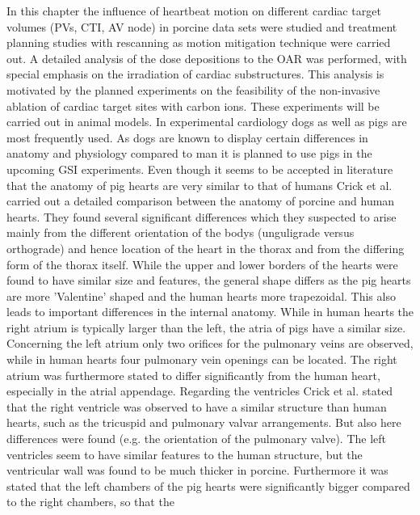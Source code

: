 \documentclass[type=dr, dr=rernat, accentcolor=tud7b,colorbacktitle, bigchapter, openright, twoside, 12pt ]{tudthesis}
\begin{document}
In this chapter the influence of heartbeat motion on different cardiac target volumes (PVs, CTI, AV node) in porcine data sets were studied 
and treatment planning studies with rescanning as motion mitigation technique were carried out. A detailed analysis of the dose depositions to 
the OAR was performed, with special emphasis on the irradiation of cardiac substructures. This analysis is motivated by the planned 
experiments on the feasibility of the non-invasive ablation of cardiac target sites with carbon ions. These experiments will be carried out 
in animal models. In experimental cardiology dogs as well as pigs are most frequently used. As dogs are known to display certain differences 
in anatomy and physiology compared to man \cite{Hug86} \cite{Cri98} it is planned to use pigs in the upcoming GSI experiments.\newline
\newline
Even though it seems to be accepted in literature that the anatomy of pig hearts are very similar to that of humans 
\cite{Lum66} \cite{Dou72} \cite{Hug86} \cite{Coo91} \cite{Whi93} Crick et al. \cite{Cri98} carried out a detailed comparison between the 
anatomy of porcine and human hearts. They found several significant differences which they suspected to arise mainly from the different 
orientation of the bodys (unguligrade versus orthograde) and hence location of the heart in the thorax and from the differing form of 
the thorax itself. While the upper and lower borders of 
the hearts were found to have similar size and features, the general shape differs as the pig hearts are more 'Valentine' shaped and the human 
hearts more trapezoidal. This also leads to important differences  in the internal anatomy. While in human hearts the right atrium is 
typically larger than the left, the atria of pigs have a similar size. Concerning the left atrium only two orifices for the pulmonary veins 
are observed, while in human hearts four pulmonary vein openings can be located. The right atrium was furthermore stated to differ 
significantly from the human heart, especially in the atrial appendage. 
Regarding the ventricles Crick et al. stated that the right ventricle was observed to have a similar structure than human hearts, such as 
the tricuspid and pulmonary valvar arrangements. But also here differences were found (e.g. the orientation of the pulmonary valve). 
The left ventricles seem to have similar features to the human structure, but the ventricular wall was found to be much thicker in porcine. 
Furthermore it was stated that the left chambers of the pig hearts were significantly bigger compared to the right chambers, so that the 
\end{document}
